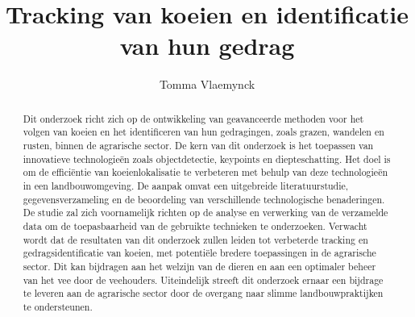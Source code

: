 \documentclass{hogent-article}
\title{Tracking van koeien en identificatie van hun gedrag}
\author{Tomma Vlaemynck}
\begin{document}
\begin{abstract}
  Dit onderzoek richt zich op de ontwikkeling van geavanceerde methoden voor het volgen van koeien en het identificeren van hun gedragingen, zoals grazen, wandelen en rusten, binnen de agrarische sector. 
  De kern van dit onderzoek is het toepassen van innovatieve technologieën zoals objectdetectie, keypoints en diepteschatting. 
  Het doel is om de efficiëntie van koeienlokalisatie te verbeteren met behulp van deze technologieën in een landbouwomgeving. 
  De aanpak omvat een uitgebreide literatuurstudie, gegevensverzameling en de beoordeling van verschillende technologische benaderingen. 
  De studie zal zich voornamelijk richten op de analyse en verwerking van de verzamelde data om de toepasbaarheid van de gebruikte technieken te onderzoeken. 
  Verwacht wordt dat de resultaten van dit onderzoek zullen leiden tot verbeterde tracking en gedragsidentificatie van koeien, met potentiële bredere toepassingen in de agrarische sector. 
  Dit kan bijdragen aan het welzijn van de dieren en aan een optimaler beheer van het vee door de veehouders. Uiteindelijk streeft dit onderzoek ernaar een bijdrage te leveren aan de agrarische sector door de overgang naar slimme landbouwpraktijken te ondersteunen.
\end{abstract}

\tableofcontents



\printbibliography[heading=bibintoc]
\end{document}
